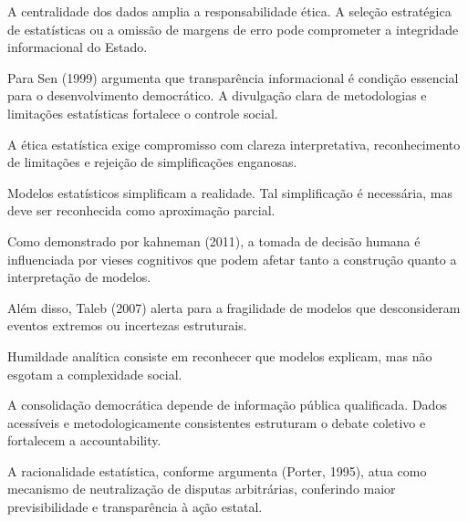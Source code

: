 
A centralidade dos dados amplia a responsabilidade ética. A seleção estratégica de estatísticas ou a omissão de margens de erro pode comprometer a integridade informacional do Estado. \vskip0.3cm

Para Sen (1999) argumenta que transparência informacional é condição essencial para o desenvolvimento democrático. A divulgação clara de metodologias e limitações estatísticas fortalece o controle social. \vskip0.3cm

A ética estatística exige compromisso com clareza interpretativa, reconhecimento de limitações e rejeição de simplificações enganosas. \vskip0.3cm


Modelos estatísticos simplificam a realidade. Tal simplificação é necessária, mas deve ser reconhecida como aproximação parcial. \vskip0.3cm

\newpage
Como demonstrado por kahneman (2011), a tomada de decisão humana é influenciada por vieses cognitivos que podem afetar tanto a construção quanto a interpretação de modelos. \vskip0.3cm

Além disso, Taleb (2007) alerta para a fragilidade de modelos que desconsideram eventos extremos ou incertezas estruturais. \vskip0.3cm

Humildade analítica consiste em reconhecer que modelos explicam, mas não esgotam a complexidade social. \vskip0.3cm


A consolidação democrática depende de informação pública qualificada. Dados acessíveis e metodologicamente consistentes estruturam o debate coletivo e fortalecem a accountability. \vskip0.3cm

A racionalidade estatística, conforme argumenta (Porter, 1995), atua como mecanismo de neutralização de disputas arbitrárias, conferindo maior previsibilidade e transparência à ação estatal. \vskip0.3cm
 
